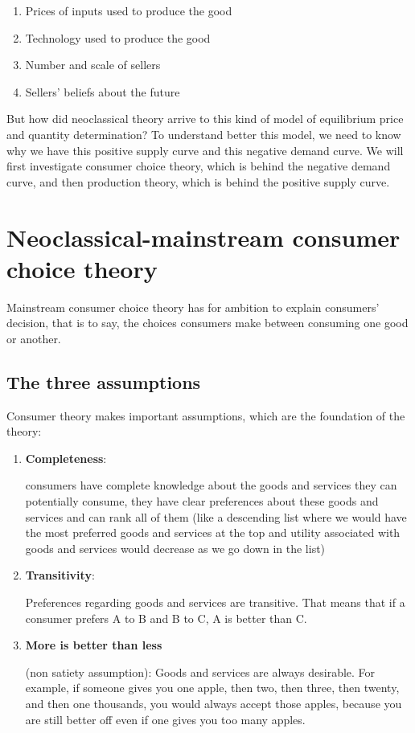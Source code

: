 \documentclass[
  letterpaper,
  DIV=11,
  numbers=noendperiod]{scrreprt}
\providecommand{\tightlist}{%
  \setlength{\itemsep}{0pt}\setlength{\parskip}{0pt}}\usepackage{longtable,booktabs,array}
\begin{document}
\begin{enumerate}
\def\labelenumi{\arabic{enumi}.}
\tightlist
\item
  Prices of inputs used to produce the good
\item
  Technology used to produce the good
\item
  Number and scale of sellers
\item
  Sellers' beliefs about the future
\end{enumerate}

But how did neoclassical theory arrive to this kind of model of
equilibrium price and quantity determination? To understand better this
model, we need to know why we have this positive supply curve and this
negative demand curve. We will first investigate consumer choice theory,
which is behind the negative demand curve, and then production theory,
which is behind the positive supply curve.

\hypertarget{neoclassical-mainstream-consumer-choice-theory}{%
\chapter{Neoclassical-mainstream consumer choice
theory}\label{neoclassical-mainstream-consumer-choice-theory}}

Mainstream consumer choice theory has for ambition to explain consumers'
decision, that is to say, the choices consumers make between consuming
one good or another.

\hypertarget{the-three-assumptions}{%
\section{The three assumptions}\label{the-three-assumptions}}

Consumer theory makes important assumptions, which are the foundation of
the theory:

\begin{enumerate}
\def\labelenumi{\arabic{enumi}.}
\item
  \textbf{Completeness}:

  consumers have complete knowledge about the goods and services they
  can potentially consume, they have clear preferences about these goods
  and services and can rank all of them (like a descending list where we
  would have the most preferred goods and services at the top and
  utility associated with goods and services would decrease as we go
  down in the list)
\item
  \textbf{Transitivity}:

  Preferences regarding goods and services are transitive. That means
  that if a consumer prefers A to B and B to C, A is better than C.
\item
  \textbf{More is better than less}

  (non satiety assumption): Goods and services are always desirable. For
  example, if someone gives you one apple, then two, then three, then
  twenty, and then one thousands, you would always accept those apples,
  because you are still better off even if one gives you too many
  apples.
\end{enumerate}
\end{document}
